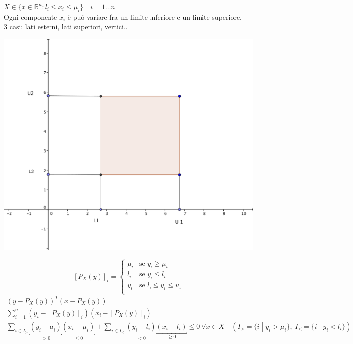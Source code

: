 \begin{example}
$X \in \{ x \in \mathbb{R}^{n} : l_i \leq x_i \leq \mu_i \}
\quad
i =1 \ldots n
$\\
Ogni componente $x_i$ \`e pu\'o variare fra un limite inferiore e un limite superiore.\\
3 casi:
lati esterni, lati superiori, vertici..

\begin{center}
  \includegraphics[scale=0.8]{imgs/vincoloscatola.png}
\end{center}


$$[P_{X} (y)]_{i} =
\left\{
\begin{array}{ll}
\mu_i & \text{se } y_i \geq \mu_i \\
l_i & \text{se } y_i \leq l_i \\
y_i & \text{se } l_i \leq y_i \leq u_i \\
\end{array}
\right.
$$
$$
\begin{array}{l}
(y - P_{X}(y))^{T}(x- P_X(y)) = \\
\displaystyle \sum_{i=1}^{n}(y_i - [P_X(y)]_{i})(x_i-[P_{X}(y)]_i)
= \\
 \displaystyle \sum_{i \in I_{>}}
\underbracket{(y_i - \mu_i)}_{> 0} \underbracket{(x_i - \mu_i)}_{\leq 0}
+
\displaystyle \sum_{i \in I_{<}}
\underbracket{(y_i - l_i)}_{< 0} \underbracket{(x_i - l_i)}_{\geq 0} \leq 0
\; \forall x \in X \quad (I_{>} = \{ i \; | \; y_i > \mu_i \}, \;
I_{<} = \{ i \; | \; y_i < l_i \} )
\end{array}
$$
\end{example}

